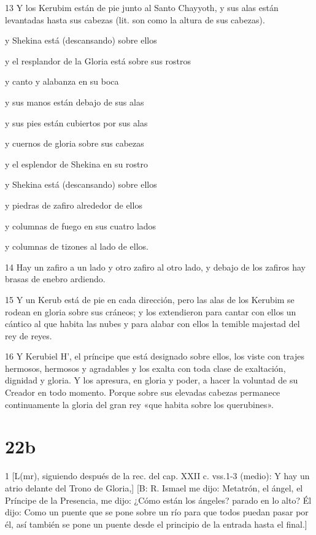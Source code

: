 \par 13 Y los Kerubim están de pie junto al Santo Chayyoth, y sus alas están levantadas hasta sus cabezas (lit. son como la altura de sus cabezas).
\par y Shekina está (descansando) sobre ellos
\par y el resplandor de la Gloria está sobre sus rostros
\par y canto y alabanza en su boca
\par y sus manos están debajo de sus alas
\par y sus pies están cubiertos por sus alas
\par y cuernos de gloria sobre sus cabezas
\par y el esplendor de Shekina en su rostro
\par y Shekina está (descansando) sobre ellos
\par y piedras de zafiro alrededor de ellos
\par y columnas de fuego en sus cuatro lados
\par y columnas de tizones al lado de ellos.

\par 14 Hay un zafiro a un lado y otro zafiro al otro lado, y debajo de los zafiros hay brasas de enebro ardiendo.

\par 15 Y un Kerub está de pie en cada dirección, pero las alas de los Kerubim se rodean en gloria sobre sus cráneos; y los extendieron para cantar con ellos un cántico al que habita las nubes y para alabar con ellos la temible majestad del rey de reyes.

\par 16 Y Kerubiel H', el príncipe que está designado sobre ellos, los viste con trajes hermosos, hermosos y agradables y los exalta con toda clase de exaltación, dignidad y gloria. Y los apresura, en gloria y poder, a hacer la voluntad de su Creador en todo momento. Porque sobre sus elevadas cabezas permanece continuamente la gloria del gran rey «que habita sobre los querubines».

\chapter{22b}

\par 1 [L(mr), siguiendo después de la rec. del cap. XXII c. vss.1-3 (medio): Y hay un atrio delante del Trono de Gloria,] [B: R. Ismael me dijo: Metatrón, el ángel, el Príncipe de la Presencia, me dijo: ¿Cómo están los ángeles? parado en lo alto? Él dijo: Como un puente que se pone sobre un río para que todos puedan pasar por él, así también se pone un puente desde el principio de la entrada hasta el final.]


